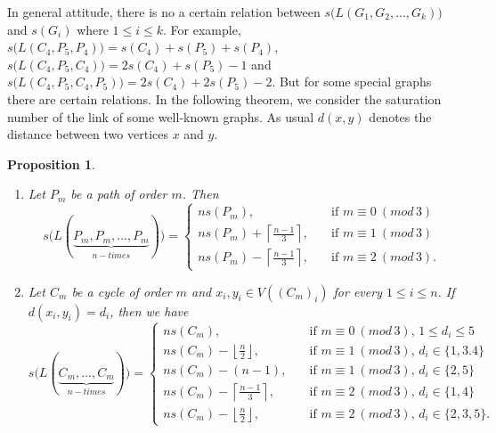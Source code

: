 \documentclass[11pt]{article}
\newtheorem{proposition}[theorem]{Proposition}
\begin{document}
In general attitude, there is no a certain relation between $s\big(L(G_1, G_2, ..., G_k)\big)$ and $s(G_i)$ where 
$1\leq i\leq k$. For example, $s\big(L(C_4, P_5, P_4)\big)=s(C_4)+s(P_5)+s(P_4)$, $s\big(L(C_4, P_5, C_4)\big)=2s(C_4)+s(P_5)-1$ and $s\big(L(C_4, P_5, C_4, P_5)\big)=2s(C_4)+2s(P_5)-2$.
But for some special graphs there are certain relations. In the following theorem, we consider the saturation number of the link of some well-known graphs. As usual $d(x,y)$ denotes the distance between two vertices $x$ and $y$. 

\begin{proposition}\label{lpc}
    \begin{enumerate}
           \item [(i)] Let $P_m$ be a path of order $m$. Then 
$$s\big(L(\underbrace{P_m, P_m, ..., P_m}_{n-times})\big)=\left\{
\begin{array}{lcl}
ns(P_m), & \quad\mbox{if $m\equiv 0 ~ (mod\, 3)$}\\[15pt]
ns(P_m)+\left\lceil{\frac{n-1}{3}}\right\rceil, & \quad\mbox{if $m\equiv 1 ~ (mod\, 3)$}\\[15pt]
ns(P_m)-\left\lceil{\frac{n-1}{3}}\right\rceil, & \quad\mbox{if $m\equiv 2 ~ (mod\, 3)$}.
\end{array}
\right.$$

           \item [(ii)] Let $C_m$ be a cycle of order $m$ and $x_i, y_i\in V({(C_m)}_i)$ for every $1\leq i\leq n$. If $d(x_i,y_i)=d_i$, then we have $$s\big(L(\underbrace{C_m,..., C_m}_{n-times})\big)=\left\{
\begin{array}{lcl}
ns(C_m), & \quad\mbox{if $m\equiv 0 ~ (mod\, 3)$, $1\leq d_i\leq 5$ }\\[15pt]
ns(C_m)-\left\lfloor{\frac{n}{2}}\right\rfloor, & \quad\mbox{if $m\equiv 1 ~ (mod\, 3)$, $d_i\in \{1,3.4\}$ }\\[15pt]
ns(C_m)-(n-1), & \quad\mbox{if $m\equiv 1 ~ (mod\, 3)$, $d_i\in \{2,5\}$ }\\[15pt]
ns(C_m)-\left\lceil{\frac{n-1}{3}}\right\rceil, & \quad\mbox{if $m\equiv 2 ~ (mod\, 3)$, $d_i\in \{1,4\}$ }\\[15pt]
ns(C_m)-\left\lfloor{\frac{n}{2}}\right\rfloor, & \quad\mbox{if $m\equiv 2 ~ (mod\, 3)$, $d_i\in \{2,3,5\}$}.
\end{array}
\right.$$
\end{enumerate}
\end{proposition} 
\end{document}
